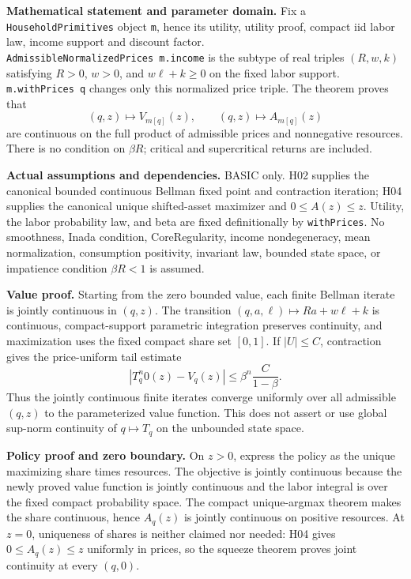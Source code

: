 \documentclass[
  11pt,
]{article}
\let\LedgerOriginalTexttt\texttt
\renewcommand{\texttt}[1]{{\small\LedgerOriginalTexttt{#1}}}
\begin{document}
\textbf{Mathematical statement and parameter domain.} Fix a
\texttt{HouseholdPrimitives} object \texttt{m}, hence its utility,
utility proof, compact iid labor law, income support and discount
factor. \texttt{AdmissibleNormalizedPrices\ m.income} is the subtype of
real triples \((R,w,k)\) satisfying \(R>0\), \(w>0\), and
\(w\ell+k\geq0\) on the fixed labor support. \texttt{m.withPrices\ q}
changes only this normalized price triple. The theorem proves that \[
(q,z)\longmapsto V_{m[q]}(z),\qquad
(q,z)\longmapsto A_{m[q]}(z)
\] are continuous on the full product of admissible prices and
nonnegative resources. There is no condition on \(\beta R\); critical
and supercritical returns are included.

\textbf{Actual assumptions and dependencies.} BASIC only. H02 supplies
the canonical bounded continuous Bellman fixed point and contraction
iteration; H04 supplies the canonical unique shifted-asset maximizer and
\(0\leq A(z)\leq z\). Utility, the labor probability law, and beta are
fixed definitionally by \texttt{withPrices}. No smoothness, Inada
condition, CoreRegularity, income nondegeneracy, mean normalization,
consumption positivity, invariant law, bounded state space, or
impatience condition \(\beta R<1\) is assumed.

\textbf{Value proof.} Starting from the zero bounded value, each finite
Bellman iterate is jointly continuous in \((q,z)\). The transition
\((q,a,\ell)\mapsto Ra+w\ell+k\) is continuous, compact-support
parametric integration preserves continuity, and maximization uses the
fixed compact share set \([0,1]\). If \(|U|\leq C\), contraction gives
the price-uniform tail estimate \[
\left|T_q^n0(z)-V_q(z)\right|
\leq \beta^n\frac{C}{1-\beta}.
\] Thus the jointly continuous finite iterates converge uniformly over
all admissible \((q,z)\) to the parameterized value function. This does
not assert or use global sup-norm continuity of \(q\mapsto T_q\) on the
unbounded state space.

\textbf{Policy proof and zero boundary.} On \(z>0\), express the policy
as the unique maximizing share times resources. The objective is jointly
continuous because the newly proved value function is jointly continuous
and the labor integral is over the fixed compact probability space. The
compact unique-argmax theorem makes the share continuous, hence
\(A_q(z)\) is jointly continuous on positive resources. At \(z=0\),
uniqueness of shares is neither claimed nor needed: H04 gives
\(0\leq A_q(z)\leq z\) uniformly in prices, so the squeeze theorem
proves joint continuity at every \((q,0)\).
\end{document}
